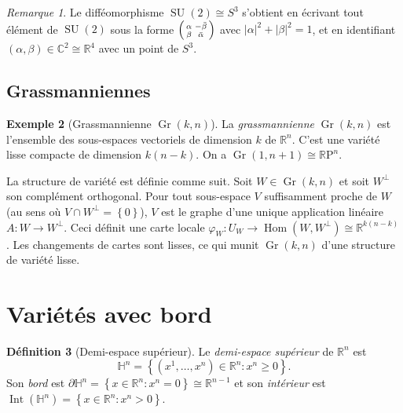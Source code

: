 \documentclass[12pt,a4paper,openany]{book}
\theoremstyle{definition}
\newtheorem{definition}{Définition}[chapter]
\newtheorem{exemple}[definition]{Exemple}
\theoremstyle{plain}
\theoremstyle{remark}
\newtheorem{remarque}[definition]{Remarque}
\newcommand{\R}{\mathbb{R}}
\newcommand{\C}{\mathbb{C}}
\newcommand{\RP}{\mathbb{R}\mathrm{P}}
\DeclareMathOperator{\SU}{SU}
\newcommand{\set}[1]{\left\{#1\right\}}
\begin{document}
\begin{remarque}\label{rem:SU2-S3}
Le difféomorphisme $\SU(2) \cong S^3$ s'obtient en écrivant tout élément de
$\SU(2)$ sous la forme
$\begin{psmallmatrix} \alpha & -\bar\beta \\ \beta & \bar\alpha
\end{psmallmatrix}$ avec $|\alpha|^2 + |\beta|^2 = 1$, et en identifiant
$(\alpha, \beta) \in \C^2 \cong \R^4$ avec un point de $S^3$.
\end{remarque}

\subsection{Grassmanniennes}

\begin{exemple}[Grassmannienne $\operatorname{Gr}(k,n)$]\label{ex:grassmannienne}
La \emph{grassmannienne} $\operatorname{Gr}(k,n)$ est l'ensemble des
sous-espaces vectoriels de dimension $k$ de $\R^n$. C'est une variété lisse
compacte de dimension $k(n-k)$. On a $\operatorname{Gr}(1, n+1) \cong \RP^n$.

La structure de variété est définie comme suit. Soit $W \in
\operatorname{Gr}(k,n)$ et soit $W^\perp$ son complément orthogonal. Pour
tout sous-espace $V$ suffisamment proche de $W$ (au sens où $V \cap W^\perp =
\set{0}$), $V$ est le graphe d'une unique application linéaire $A \colon W \to
W^\perp$. Ceci définit une carte locale $\varphi_W \colon U_W \to
\operatorname{Hom}(W, W^\perp) \cong \R^{k(n-k)}$. Les changements de cartes
sont lisses, ce qui munit $\operatorname{Gr}(k,n)$ d'une structure de variété
lisse.
\end{exemple}


\section{Variétés avec bord}
\label{sec:varietes-bord}

\begin{definition}[Demi-espace supérieur]\label{def:demi-espace}
Le \emph{demi-espace supérieur} de $\R^n$ est
\[
    \mathbb{H}^n = \set{(x^1, \ldots, x^n) \in \R^n : x^n \geq 0}.
\]
Son \emph{bord} est $\partial \mathbb{H}^n = \set{x \in \R^n : x^n = 0}
\cong \R^{n-1}$ et son \emph{intérieur} est $\operatorname{Int}(\mathbb{H}^n) =
\set{x \in \R^n : x^n > 0}$.
\end{definition}
\end{document}
